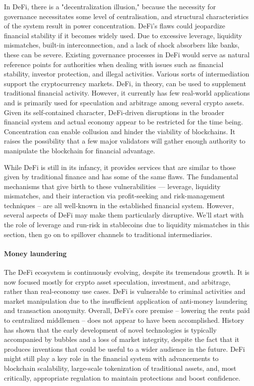 \documentclass[10pt,twocolumn]{article}
\begin{document}
In DeFi, there is a "decentralization illusion," because the necessity for governance necessitates some level of centralisation, and structural characteristics of the system result in power concentration. DeFi's flaws could jeopardize financial stability if it becomes widely used. Due to excessive leverage, liquidity mismatches, built-in interconnection, and a lack of shock absorbers like banks, these can be severe. Existing governance processes in DeFi would serve as natural reference points for authorities when dealing with issues such as financial stability, investor protection, and illegal activities. Various sorts of intermediation support the cryptocurrency markets. DeFi, in theory, can be used to supplement traditional financial activity.
However, it currently has few real-world applications and is primarily used for speculation and arbitrage among several crypto assets. Given its self-contained character, DeFi-driven disruptions in the broader financial system and actual economy appear to be restricted for the time being. Concentration can enable collusion and hinder the viability of blockchains. It raises the possibility that a few major validators will gather enough authority to manipulate the blockchain for financial advantage. 

While DeFi is still in its infancy, it provides services that are similar to those given by traditional finance and has some of the same flaws. The fundamental mechanisms that give birth to these vulnerabilities — leverage, liquidity mismatches, and their interaction via profit-seeking and risk-management techniques – are all well-known in the established financial system. However, several aspects of DeFi may make them particularly disruptive. We'll start with the role of leverage and run-risk in stablecoins due to liquidity mismatches in this section, then go on to spillover channels to traditional intermediaries.
\paragraph{Money laundering}

The DeFi ecosystem is continuously evolving, despite its tremendous growth. It is now focused mostly for crypto asset speculation, investment, and arbitrage, rather than real-economy use cases. DeFi is vulnerable to criminal activities and market manipulation due to the insufficient application of anti-money laundering and transaction anonymity. Overall, DeFi's core premise – lowering the rents paid to centralized middlemen – does not appear to have been accomplished.
History has shown that the early development of novel technologies is typically accompanied by bubbles and a loss of market integrity, despite the fact that it produces inventions that could be useful to a wider audience in the future. DeFi might still play a key role in the financial system with advancements to blockchain scalability, large-scale tokenization of traditional assets, and, most critically, appropriate regulation to maintain protections and boost confidence.
\end{document}
